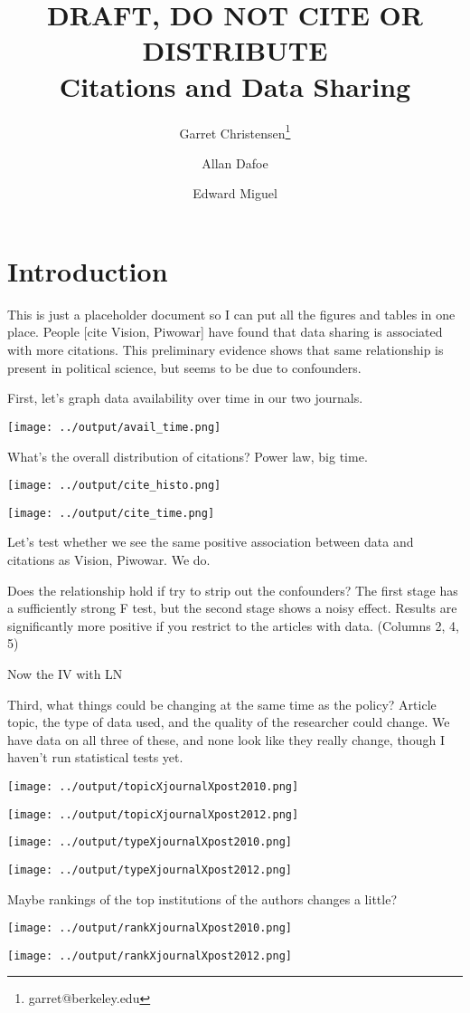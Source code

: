\documentclass[11pt]{article} %
\title{DRAFT, DO NOT CITE OR DISTRIBUTE \\ Citations and Data Sharing}
\author[1]{Garret Christensen\thanks{garret@berkeley.edu}}
\author[2]{Allan Dafoe}
\author[3]{Edward Miguel}
\affil[1]{Berkeley Institute for Data Science}
\affil[2]{Yale University Department of Political Science}
\affil[3]{UC Berkeley Department of Economics and National Bureau of Economic Research}
\date{} %
\begin{document}
\maketitle

\section{Introduction}

This is just a placeholder document so I can put all the figures and tables in one place. People [cite Vision, Piwowar] have found that data sharing is associated with more citations. This preliminary evidence shows that same relationship is present in political science, but seems to be due to confounders.

First, let's graph data availability over time in our two journals.

\texttt{[image: ../output/avail\_time.png]}
\pagebreak

What's the overall distribution of citations? Power law, big time.

\texttt{[image: ../output/cite\_histo.png]}

\texttt{[image: ../output/cite\_time.png]}
\pagebreak

Let's test whether we see the same positive association between data and citations as Vision, Piwowar. We do.


\clearpage

\clearpage

Does the relationship hold if try to strip out the confounders? The first stage has a sufficiently strong F test, but the second stage shows a noisy effect. Results are significantly more positive if you restrict to the articles with data. (Columns 2, 4, 5)

\scalebox{0.8}{

}
\pagebreak

Now the IV with LN

\scalebox{1.0}{

}
\pagebreak

Third, what things could be changing at the same time as the policy? Article topic, the type of data used, and the quality of the researcher could change. We have data on all three of these, and none look like they really change, though I haven't run statistical tests yet.


\texttt{[image: ../output/topicXjournalXpost2010.png]}

\texttt{[image: ../output/topicXjournalXpost2012.png]}

\texttt{[image: ../output/typeXjournalXpost2010.png]}

\texttt{[image: ../output/typeXjournalXpost2012.png]}

Maybe rankings of the top institutions of the authors changes a little?

\texttt{[image: ../output/rankXjournalXpost2010.png]}

\texttt{[image: ../output/rankXjournalXpost2012.png]}
\end{document}

